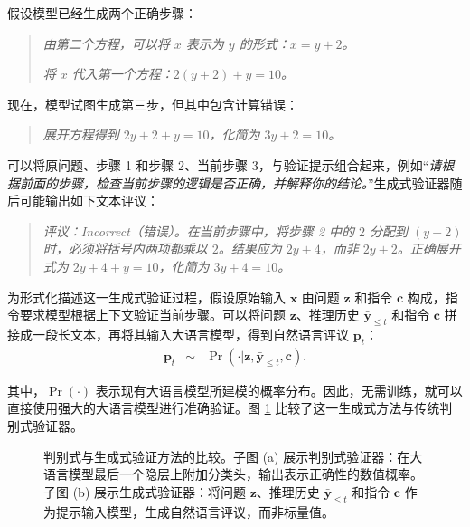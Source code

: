 假设模型已经生成两个正确步骤：
\vspace{0.5em}
\begin{quote}
\textit{由第二个方程，可以将 $x$ 表示为 $y$ 的形式：$x = y + 2$。}

\textit{将 $x$ 代入第一个方程：$2(y + 2) + y = 10$。}
\end{quote}
\vspace{0.5em}

现在，模型试图生成第三步，但其中包含计算错误：

\vspace{0.5em}
\begin{quote}
\textit{展开方程得到 $2y + 2 + y = 10$，化简为 $3y + 2 = 10$。}
\end{quote}
\vspace{0.5em}

可以将原问题、步骤 1 和步骤 2、当前步骤 3，与验证提示组合起来，例如“\textit{请根据前面的步骤，检查当前步骤的逻辑是否正确，并解释你的结论。}”生成式验证器随后可能输出如下文本评议：
\vspace{0.5em}
\begin{quote}
\textit{评议：Incorrect（错误）。在当前步骤中，将步骤 2 中的 $2$ 分配到 $(y + 2)$ 时，必须将括号内两项都乘以 $2$。结果应为 $2y + 4$，而非 $2y + 2$。正确展开式为 $2y + 4 + y = 10$，化简为 $3y + 4 = 10$。}
\end{quote}
\vspace{0.5em}

为形式化描述这一生成式验证过程，假设原始输入 $\mathbf{x}$ 由问题 $\mathbf{z}$ 和指令 $\mathbf{c}$ 构成，指令要求模型根据上下文验证当前步骤。可以将问题 $\mathbf{z}$、推理历史 $\bar{\mathbf{y}}_{\le t}$ 和指令 $\mathbf{c}$ 拼接成一段长文本，再将其输入大语言模型，得到自然语言评议 $\mathbf{p}_t$：
\begin{eqnarray}
\mathbf{p}_t & \sim & \Pr(\cdot | \mathbf{z}, \bar{\mathbf{y}}_{\le t}, \mathbf{c}).
\end{eqnarray}

\noindent 其中，$\Pr(\cdot)$ 表示现有大语言模型所建模的概率分布。因此，无需训练，就可以直接使用强大的大语言模型进行准确验证。图 \ref{fig:pre-generative-verfication} 比较了这一生成式方法与传统判别式验证器。

\begin{figure}[!t]
\centering

\caption{判别式与生成式验证方法的比较。子图 (a) 展示判别式验证器：在大语言模型最后一个隐层上附加分类头，输出表示正确性的数值概率。子图 (b) 展示生成式验证器：将问题 $\mathbf{z}$、推理历史 $\bar{\mathbf{y}}_{\le t}$ 和指令 $\mathbf{c}$ 作为提示输入模型，生成自然语言评议，而非标量值。}
\label{fig:pre-generative-verfication}
\end{figure}


